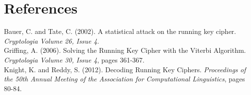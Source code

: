 \documentclass[letterpaper,12pt]{article}
\begin{document}
\section{References}
Bauer, C. and Tate, C. (2002). A statistical attack
on the running key cipher. \textit{Cryptologia Volume 26, Issue 4}.\\
Griffing, A. (2006). Solving the Running Key Cipher with the Viterbi Algorithm. \textit{Cryptologia Volume 30, Issue 4}, pages 361-367.\\
Knight, K. and Reddy, S. (2012). Decoding Running Key Ciphers. \textit{Proceedings of the 50th Annual Meeting of the Association for Computational Linguistics},  pages 80-84.\\
\end{document}
